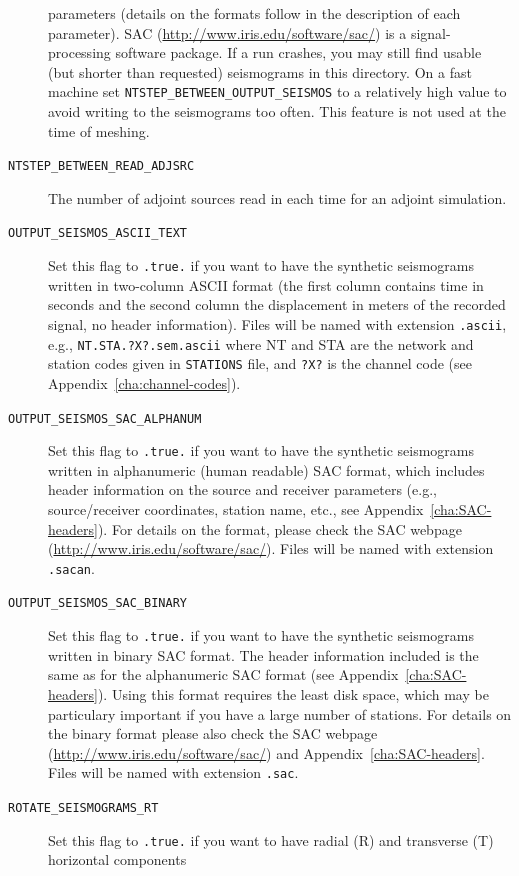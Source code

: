 \documentclass[oneside,english]{book}
\newcommand{\urlwithparentheses}[1]{(\url{#1})}
\begin{document}
\begin{description}
parameters (details on the formats follow in the description of each
parameter). SAC \urlwithparentheses{http://www.iris.edu/software/sac/} is a signal-processing software
package. If a run crashes, you may still find usable (but shorter
than requested) seismograms in this directory. On a fast machine set
\texttt{NTSTEP\_BETWEEN\_OUTPUT\_SEISMOS} to a relatively high value
to avoid writing to the seismograms too often. This feature is not
used at the time of meshing.
\item [{\texttt{NTSTEP\_BETWEEN\_READ\_ADJSRC}}] The number of adjoint
sources read in each time for an adjoint simulation.
\item [{\texttt{OUTPUT\_SEISMOS\_ASCII\_TEXT}}] Set this flag to \texttt{.true.}
if you want to have the synthetic seismograms written in two-column
ASCII format (the first column contains time in seconds and the second
column the displacement in meters of the recorded signal, no header
information). Files will be named with extension \texttt{.ascii}, e.g., \texttt{NT.STA.?X?.sem.ascii}
where NT and STA are the network and station codes given in \texttt{STATIONS} file, and \texttt{?X?} is the channel code (see Appendix~\ref{cha:channel-codes}).
\item [{\texttt{OUTPUT\_SEISMOS\_SAC\_ALPHANUM}}] Set this flag to \texttt{.true.}
if you want to have the synthetic seismograms written in alphanumeric
(human readable) SAC format, which includes header information on
the source and receiver parameters (e.g., source/receiver coordinates,
station name, etc., see Appendix~\ref{cha:SAC-headers}). For details on the format, please check the SAC webpage \urlwithparentheses{http://www.iris.edu/software/sac/}. Files will be named with extension \texttt{.sacan}.
\item [{\texttt{OUTPUT\_SEISMOS\_SAC\_BINARY}}] Set this flag to \texttt{.true.}
if you want to have the synthetic seismograms written in binary SAC
format. The header information included is the same as for the alphanumeric
SAC format (see Appendix~\ref{cha:SAC-headers}). Using this format requires the least disk space, which may be particulary important if you have a large number of stations.
For details on the binary format please also check the SAC webpage \urlwithparentheses{http://www.iris.edu/software/sac/} and Appendix~\ref{cha:SAC-headers}. Files will be named with extension \texttt{.sac}.
\item [{\texttt{ROTATE\_SEISMOGRAMS\_RT}}] Set this flag to \texttt{.true.}
if you want to have radial (R) and transverse (T) horizontal components

\end{description}
\end{document}
